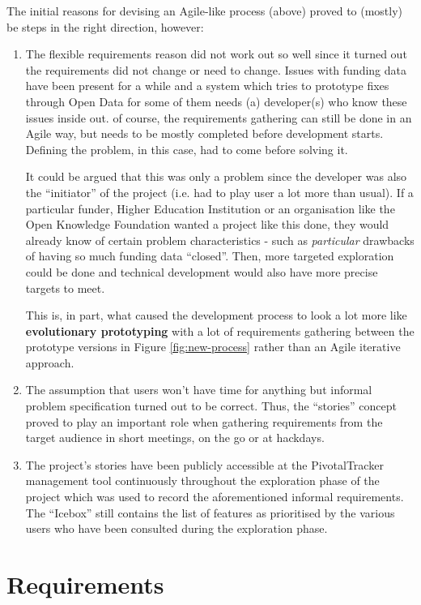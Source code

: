 The initial reasons for devising an Agile-like process (above) proved to (mostly) be steps in the right direction, however:
\begin{enumerate}
 \item The flexible requirements reason did not work out so well since it turned out the requirements did not change or need to change. Issues with funding data have been present for a while and a system which tries to prototype fixes through Open Data for some of them needs (a) developer(s) who know these issues inside out. of course, the requirements gathering can still be done in an Agile way, but needs to be mostly completed before development starts. Defining the problem, in this case, had to come before solving it.
 
 It could be argued that this was only a problem since the developer was also the ``initiator'' of the project (i.e. had to play user a lot more than usual). If a particular funder, Higher Education Institution or an organisation like the Open Knowledge Foundation wanted a project like this done, they would already know of certain problem characteristics - such as \emph{particular} drawbacks of having so much funding data ``closed''. Then, more targeted exploration could be done and technical development would also have more precise targets to meet.
 
 This is, in part, what caused the development process to look a lot more like \textbf{evolutionary prototyping} with a lot of requirements gathering between the prototype versions in Figure \ref{fig:new-process} rather than an Agile iterative approach.
 
 \item The assumption that users won't have time for anything but informal problem specification turned out to be correct. Thus, the ``stories'' concept proved to play an important role when gathering requirements from the target audience in short meetings, on the go or at hackdays.
 
 \item The project's stories have been publicly accessible at the PivotalTracker management tool continuously throughout the exploration phase of the project which was used to record the aforementioned informal requirements. The ``Icebox'' still contains the list of features as prioritised by the various users who have been consulted during the exploration phase.
\end{enumerate}

\section{Requirements}
\label{devprocess-requirements}

